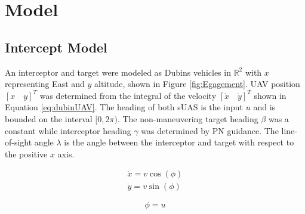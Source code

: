 \documentclass[conference]{IEEEtran}
\providecommand{\DIFdelbegin}{} %
\providecommand{\DIFdelend}{} %
\newcommand{\DIFscaledelfig}{0.5}
\newlength{\DIFdelgraphicswidth} %
\newlength{\DIFdelgraphicsheight} %
\newcommand{\DIFdelincludegraphics}[2][]{%
\sbox{\DIFdelgraphicsbox}{\DIFOincludegraphics[#1]{#2}}%
\settoboxwidth{\DIFdelgraphicswidth}{\DIFdelgraphicsbox} %
\settoboxtotalheight{\DIFdelgraphicsheight}{\DIFdelgraphicsbox} %
\scalebox{\DIFscaledelfig}{%
\parbox[b]{\DIFdelgraphicswidth}{\usebox{\DIFdelgraphicsbox}\\[-\baselineskip] \rule{\DIFdelgraphicswidth}{0em}}\llap{\resizebox{\DIFdelgraphicswidth}{\DIFdelgraphicsheight}{%
\setlength{\unitlength}{\DIFdelgraphicswidth}%
\begin{picture}(1,1)%
\thicklines\linethickness{2pt} %
{\color[rgb]{1,0,0}\put(0,0){\framebox(1,1){}}}%
{\color[rgb]{1,0,0}\put(0,0){\line( 1,1){1}}}%
{\color[rgb]{1,0,0}\put(0,1){\line(1,-1){1}}}%
\end{picture}%
}\hspace*{3pt}}} %
} %
\DeclareRobustCommand{\DIFdelbegin}{\DIFOdelbegin \let\includegraphics\DIFdelincludegraphics} %
\DeclareRobustCommand{\DIFdelend}{\DIFOaddend \let\includegraphics\DIFOincludegraphics} %
\begin{document}
\section{Model}

\DIFdelbegin %

\DIFdelend \subsection{Intercept Model}
\DIFdelbegin %

\DIFdelend An interceptor and target were modeled as Dubins vehicles in $\mathbb{R}^2$ with $x$ representing East and $y$ altitude, shown in Figure \ref{fig:Egagement}. UAV position $[x \quad y]^T$ was determined from the integral of the velocity $[\dot{x} \quad \dot{y}]^T$ shown in Equation \ref{eq:dubinUAV}. The heading of both sUAS is the input $u$ and is bounded on the interval $[0,2\pi)$. The non-maneuvering target heading $\beta$ was a constant while interceptor heading $\gamma$ was determined by PN guidance. The line-of-sight angle $\lambda$ is the angle between the interceptor and target with respect to the positive $x$ axis. 



\begin{equation} \label{eq:dubinUAV}
\begin{split}
\dot{x} = v\cos(\phi)\\
\dot{y} = v\sin(\phi)
\end{split}
\end{equation}

\begin{equation}\label{eq:dubinsVel}
\phi = u
\end{equation}
\end{document}
